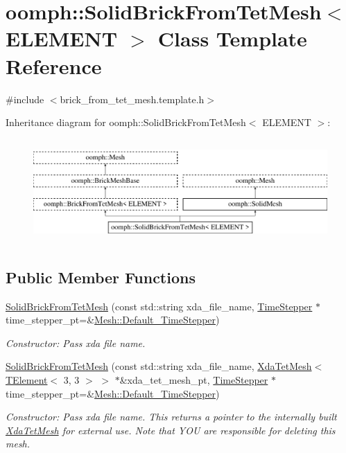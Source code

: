 \hypertarget{classoomph_1_1SolidBrickFromTetMesh}{}\section{oomph\+:\+:Solid\+Brick\+From\+Tet\+Mesh$<$ E\+L\+E\+M\+E\+NT $>$ Class Template Reference}
\label{classoomph_1_1SolidBrickFromTetMesh}


{\ttfamily \#include $<$brick\+\_\+from\+\_\+tet\+\_\+mesh.\+template.\+h$>$}

Inheritance diagram for oomph\+:\+:Solid\+Brick\+From\+Tet\+Mesh$<$ E\+L\+E\+M\+E\+NT $>$\+:\begin{figure}[H]
\begin{center}
\leavevmode
\includegraphics[height=4.000000cm]{classoomph_1_1SolidBrickFromTetMesh}
\end{center}
\end{figure}
\subsection*{Public Member Functions}
\begin{DoxyCompactItemize}
\item 
\hyperlink{classoomph_1_1SolidBrickFromTetMesh_afffe8e29788d8f748fcc6aa9d818420d}{Solid\+Brick\+From\+Tet\+Mesh} (const std\+::string xda\+\_\+file\+\_\+name, \hyperlink{classoomph_1_1TimeStepper}{Time\+Stepper} $\ast$time\+\_\+stepper\+\_\+pt=\&\hyperlink{classoomph_1_1Mesh_a12243d0fee2b1fcee729ee5a4777ea10}{Mesh\+::\+Default\+\_\+\+Time\+Stepper})
\begin{DoxyCompactList}\small\item\em Constructor\+: Pass xda file name. \end{DoxyCompactList}\item 
\hyperlink{classoomph_1_1SolidBrickFromTetMesh_a6d45c13e6c02bb636b23e72d32240619}{Solid\+Brick\+From\+Tet\+Mesh} (const std\+::string xda\+\_\+file\+\_\+name, \hyperlink{classoomph_1_1XdaTetMesh}{Xda\+Tet\+Mesh}$<$ \hyperlink{classoomph_1_1TElement}{T\+Element}$<$ 3, 3 $>$ $>$ $\ast$\&xda\+\_\+tet\+\_\+mesh\+\_\+pt, \hyperlink{classoomph_1_1TimeStepper}{Time\+Stepper} $\ast$time\+\_\+stepper\+\_\+pt=\&\hyperlink{classoomph_1_1Mesh_a12243d0fee2b1fcee729ee5a4777ea10}{Mesh\+::\+Default\+\_\+\+Time\+Stepper})
\begin{DoxyCompactList}\small\item\em Constructor\+: Pass xda file name. This returns a pointer to the internally built \hyperlink{classoomph_1_1XdaTetMesh}{Xda\+Tet\+Mesh} for external use. Note that Y\+OU are responsible for deleting this mesh. \end{DoxyCompactList}\end{DoxyCompactItemize}
